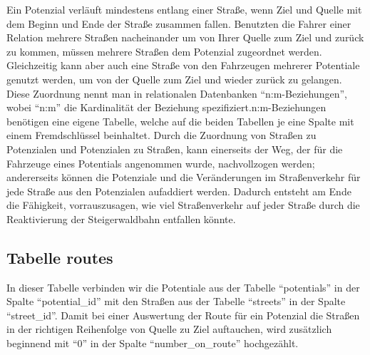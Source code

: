 \documentclass[fontsize=12pt,a4paper]{scrreprt}
\begin{document}
Ein Potenzial verläuft mindestens entlang einer Straße, wenn Ziel und Quelle mit dem Beginn und Ende der Straße zusammen fallen. Benutzten die Fahrer einer Relation mehrere Straßen nacheinander um von Ihrer Quelle zum Ziel und zurück zu kommen, müssen mehrere Straßen dem Potenzial zugeordnet werden. Gleichzeitig kann aber auch eine Straße von den Fahrzeugen mehrerer Potentiale genutzt werden, um von der Quelle zum Ziel und wieder zurück zu gelangen.\newline
\newline
Diese Zuordnung nennt man in relationalen Datenbanken \enquote{n:m-Beziehungen}, wobei \enquote{n:m} die Kardinalität der Beziehung spezifiziert.\@ n:m-Beziehungen benötigen eine eigene Tabelle, welche auf die beiden Tabellen je eine Spalte mit einem Fremdschlüssel beinhaltet.\newline
\newline
Durch die Zuordnung von Straßen zu Potenzialen und Potenzialen zu Straßen, kann einerseits der Weg, der für die Fahrzeuge eines Potentials angenommen wurde, nachvollzogen werden; andererseits können die Potenziale und die Veränderungen im Straßenverkehr für jede Straße aus den Potenzialen aufaddiert werden. Dadurch entsteht am Ende die Fähigkeit, vorrauszusagen, wie viel Straßenverkehr auf jeder Straße durch die Reaktivierung der Steigerwaldbahn entfallen könnte.

\subsection{Tabelle routes}

In dieser Tabelle verbinden wir die Potentiale aus der Tabelle \enquote{potentials} in der Spalte \enquote{potential_id} mit den Straßen aus der Tabelle \enquote{streets} in der Spalte \enquote{street_id}. Damit bei einer Auswertung der Route für ein Potenzial die Straßen in der richtigen Reihenfolge von Quelle zu Ziel auftauchen, wird zusätzlich beginnend mit \enquote{0} in der Spalte \enquote{number_on_route} hochgezählt.
\end{document}
